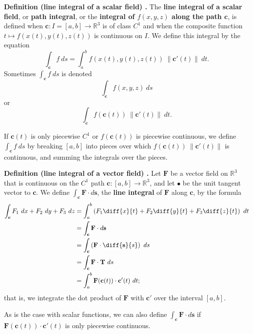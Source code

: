 \begin{shaded}
\textbf{Definition (line integral of a scalar field) \cite{marsden_vector_calculus}.} The \textbf{line integral of a scalar field}, or \textbf{path integral}, or the \textbf{integral of $f(x, y, z)$ along the path $\mathbf{c}$}, is defined when $\mathbf{c}: I = [a, b] \to \mathbb{R}^3$ is of class $C^1$ and when the composite function $t \mapsto f(x(t), y(t), z(t))$ is continuous on $I$. We define this integral by the equation
$$ \int_{\mathbf{c}} f \ ds = \int_a^b f(x(t), y(t), z(t)) \ \lVert \mathbf{c}'(t) \rVert \ dt . $$
Sometimes $\int_\mathbf{c} f \ ds$ is denoted
$$ \int_\mathbf{c} f(x, y, z) \ ds $$
or
$$ \int_\mathbf{c} f(\mathbf{c}(t)) \ \lVert \mathbf{c}'(t) \rVert \ dt . $$

If $\mathbf{c}(t)$ is only piecewise $C^1$ or $f(\mathbf{c}(t))$ is piecewise continuous, we define $\int_\mathbf{c} f \ ds$ by breaking $[a, b]$ into pieces over which $f(\mathbf{c}(t)) \ \lVert \mathbf{c}'(t) \rVert$ is continuous, and summing the integrals over the pieces.
\end{shaded}

\begin{shaded}
\textbf{Definition (line integral of a vector field) \cite{marsden_vector_calculus} \cite{thomas_calculus}.} Let $\mathbf{F}$ be a vector field on $\mathbb{R}^3$ that is continuous on the $C^1$ path $\mathbf{c} : [a, b] \to \mathbb{R}^3$, and let $\mathbf{•}$ be the unit tangent vector to $\mathbf{c}$. We define $\int_\mathbf{c} \mathbf{F} \cdot d\mathbf{s}$, the \textbf{line integral} of $\mathbf{F}$ along $\mathbf{c}$, by the formula
\begin{align*}
\int_{\mathbf{c}} F_1 \ dx + F_2 \ dy + F_3 \ dz &= \int_a^b \left( F_1 \diff{x}{t} + F_2 \diff{y}{t} + F_3 \diff{z}{t} \right) \ dt \\
&= \int_\mathbf{c} \mathbf{F} \cdot d \mathbf{s} \\
&= \int_\mathbf{c} \left( \mathbf{F} \cdot \diff{\mathbf{s}}{s} \right) \ ds \\
&= \int_\mathbf{c} \mathbf{F} \cdot \mathbf{T} \ ds \\
&= \int_a^b \mathbf{F}(\mathbf{c}(t)) \cdot \mathbf{c}'(t) \ dt ;
\end{align*}
that is, we integrate the dot product of $\mathbf{F}$ with $\mathbf{c}'$ over the interval $[a, b]$.

As is the case with scalar functions, we can also define $\int_\mathbf{c} \mathbf{F} \cdot d\mathbf{s}$ if $\mathbf{F}(\mathbf{c}(t)) \cdot \mathbf{c}'(t)$ is only piecewise continuous.
\end{shaded}


